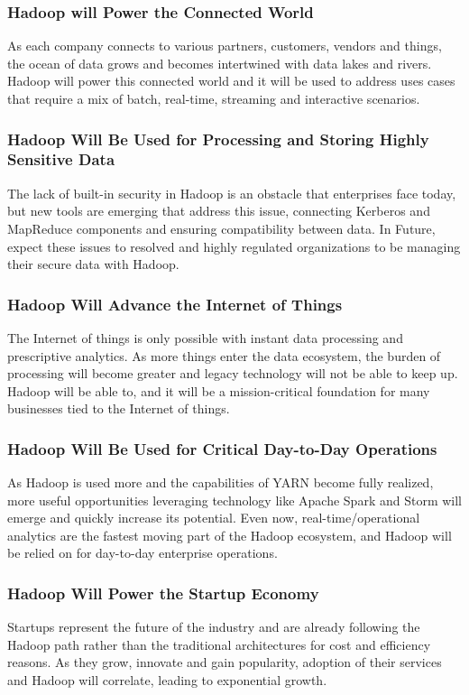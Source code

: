 \documentclass[a4paper,12pt,oneside]{report}
\begin{document}
\subsubsection{Hadoop will Power the Connected World}
As each company connects to various partners, customers, vendors and things,
the ocean of data grows and becomes intertwined with data lakes and rivers. 
Hadoop will power this connected world and it will be used to address
uses cases that require a mix of batch, real-time, streaming and interactive 
scenarios.

\subsubsection{Hadoop Will Be Used for Processing and Storing Highly Sensitive Data}
The lack of built-in security in Hadoop is an obstacle that enterprises face 
today, but new tools are emerging that address this issue, connecting Kerberos 
and MapReduce components and ensuring compatibility between data. In Future, 
expect these issues to resolved and highly regulated organizations to be managing their secure data with Hadoop.

\subsubsection{Hadoop Will Advance the Internet of Things}
The Internet of things is only possible with instant data processing and prescriptive analytics. As more things enter the data ecosystem, the burden of processing will become greater and legacy technology will not be able to keep up. Hadoop will be able to, and it will be a mission-critical foundation for many businesses tied to the Internet of things.

\subsubsection{Hadoop Will Be Used for Critical Day-to-Day Operations}
As Hadoop is used more and the capabilities of YARN become fully realized, more useful opportunities leveraging technology like Apache Spark and Storm will emerge and quickly increase its potential. Even now, real-time/operational analytics are the fastest moving part of the Hadoop ecosystem, and Hadoop will be relied on for day-to-day enterprise operations.

\subsubsection{Hadoop Will Power the Startup Economy}
Startups represent the future of the industry and are already following the Hadoop path rather than the traditional architectures for cost and efficiency reasons. As they grow, innovate and gain popularity, adoption of their services and Hadoop will correlate, leading to exponential growth.
\end{document}
